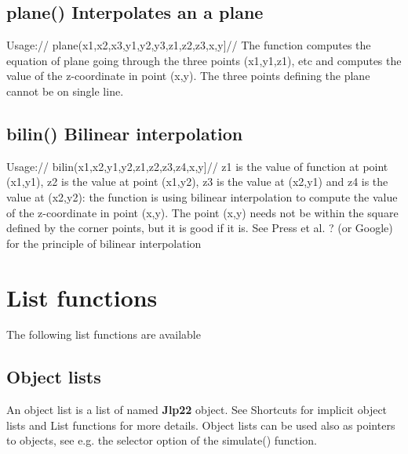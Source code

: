 \subsection{\textcolor{VioletRed}{plane}() Interpolates an a plane}
\label{plane}
Usage://
\textcolor{VioletRed}{plane}(x1,x2,x3,y1,y2,y3,z1,z2,z3,x,y]//
The function computes the equation of plane going through the three points (x1,y1,z1), etc
and computes the value of the z-coordinate in point (x,y). The three points defining the plane
cannot be on single line.
\subsection{\textcolor{VioletRed}{bilin}() Bilinear interpolation}
\label{bilin}
Usage://
\textcolor{VioletRed}{bilin}(x1,x2,y1,y2,z1,z2,z3,z4,x,y]//
z1 is the value of function at point (x1,y1), z2 is the value at point (x1,y2), z3 is the value at
(x2,y1) and z4 is the value at (x2,y2): the function is using bilinear interpolation to compute
the value of the z-coordinate in point (x,y). The point (x,y) needs not be within the square
defined by the corner points, but it is good if it is. See Press et al. ? (or Google) for the principle
of bilinear interpolation
\section{List functions}
\label{lists}
The following list functions are available
\subsection{Object lists}
\label{listo}
An object list is a list of named \textbf{Jlp22} object. See Shortcuts for implicit object
lists and List functions for more details. Object lists can be used also as
pointers to objects, see e.g. the selector option of the simulate() function.
